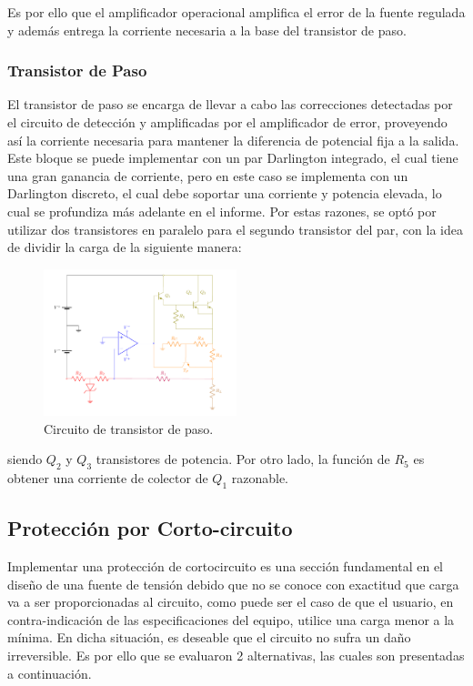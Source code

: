 Es por ello que el amplificador operacional amplifica el error de la fuente regulada y además entrega la corriente necesaria a la base del transistor de paso.

\subsubsection{Transistor de Paso}

\label{sec:transistor-de-paso}
El transistor de paso se encarga de llevar a cabo las correcciones detectadas por el circuito de detección y amplificadas por el amplificador de error, proveyendo así la corriente necesaria para mantener la diferencia de potencial fija a la salida. Este bloque se puede implementar con un par Darlington integrado, el cual tiene una gran ganancia de corriente, pero en este caso se implementa con un Darlington discreto, el cual debe soportar una corriente y potencia elevada, lo cual se profundiza más adelante en el informe. Por estas razones, se optó por utilizar dos transistores en paralelo para el segundo transistor del par, con la idea de dividir la carga de la siguiente manera:
\begin{figure}[H]
\centering
	\includegraphics[width=0.5\textwidth, page=5]{ImagenesEjercicio2/Regulador.pdf}
	\caption{Circuito de transistor de paso.}
	\label{fig:transistorDePaso}
\end{figure}
siendo $Q_2$ y $Q_3$ transistores de potencia. Por otro lado, la función de $R_5$ es obtener una corriente de colector de $Q_1$ razonable.

\subsection{Protección por Corto-circuito}
Implementar una protección de cortocircuito es una sección fundamental en el diseño de una fuente de tensión debido que no se conoce con exactitud que carga va a ser proporcionadas al circuito, como puede ser el caso de que el usuario, en contra-indicación de las especificaciones del equipo, utilice una carga menor a la mínima. En dicha situación, es deseable que el circuito no sufra un daño irreversible. Es por ello que se evaluaron 2 alternativas, las cuales son presentadas a continuación.
